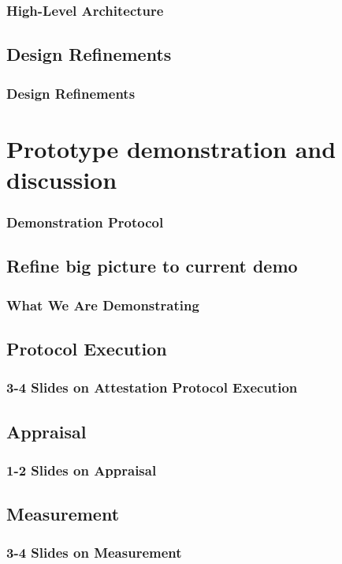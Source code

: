 \documentclass{beamer}
\begin{document}
\begin{frame}
  \frametitle{High-Level Architecture}
\end{frame}

\subsection{Design Refinements}

\begin{frame}
  \frametitle{Design Refinements}
\end{frame}

\section{Prototype demonstration and discussion}

\begin{frame}
  \frametitle{Demonstration Protocol}
\end{frame}

\subsection{Refine big picture to current demo}

\begin{frame}
  \frametitle{What We Are Demonstrating}
\end{frame}

\subsection{Protocol Execution}

\begin{frame}
  \frametitle{3-4 Slides on Attestation Protocol Execution}
\end{frame}

\subsection{Appraisal}

\begin{frame}
  \frametitle{1-2 Slides on Appraisal}
\end{frame}

\subsection{Measurement}

\begin{frame}
  \frametitle{3-4 Slides on Measurement}
\end{frame}
\end{document}
